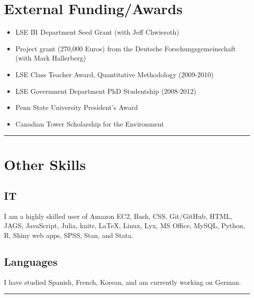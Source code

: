 \documentclass[a4paper]{article}
\begin{document}
{\section*{External Funding/Awards}

\begin{itemize}

    \item LSE IR Department Seed Grant (with Jeff Chwieroth)
    \item Project grant (270,000 Euros) from the Deutsche Forschungsgemeinschaft (with Mark Hallerberg)
    \item LSE Class Teacher Award, Quantitative Methodology (2009-2010)
    \item LSE Government Department PhD Studentship (2008-2012)
    \item Penn State University President's Award
    \item Canadian Tower Scholarship for the Environment

\end{itemize}

\vspace{0.5cm}
\medskip\hrule height 1pt
\vspace{0.5cm}

\section*{Other Skills}

\subsection*{IT}

I am a highly skilled user of Amazon EC2, Bash, CSS, Git/GitHub, HTML, JAGS, JavaScript, Julia, knitr, LaTeX, Linux, Lyx, MS Office, MySQL, Python, R, Shiny web apps, SPSS, Stan, and Stata.

\subsection*{Languages}

I have studied Spanish, French, Korean, and am currently working on German.


\vspace{0.5cm}
\medskip\hrule height 1pt
\vspace{0.5cm}

}
\end{document}

